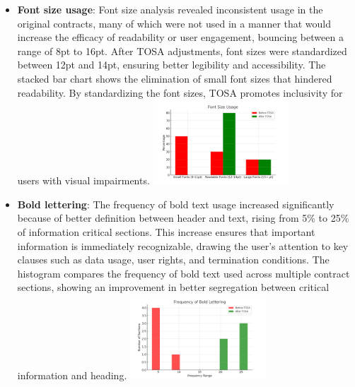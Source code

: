 \documentclass[sigconf, nonacm]{acmart}
\begin{document}
\begin{itemize}
\item \textbf{Font size usage}: Font size analysis revealed inconsistent usage in the original contracts, many of which were not used in a manner that would increase the efficacy of readability or user engagement, bouncing between a range of 8pt to 16pt. After TOSA adjustments, font sizes were standardized between 12pt and 14pt, ensuring better legibility and accessibility. The stacked bar chart shows the elimination of small font sizes that hindered readability. By standardizing the font sizes, TOSA promotes inclusivity for users with visual impairments.
{\center\includegraphics[width=0.4\textwidth]{./resources/font_size_usage_updated}}

\item \textbf{Bold lettering}: The frequency of bold text usage increased significantly because of better definition between header and text, rising from 5\% to 25\% of information critical sections. This increase ensures that important information is immediately recognizable, drawing the user's attention to key clauses such as data usage, user rights, and termination conditions. The histogram compares the frequency of bold text used across multiple contract sections, showing an improvement in better segregation between critical information and heading.
{\center\includegraphics[width=0.4\textwidth]{./resources/bold_lettering_usage_updated}}


\end{itemize}
\end{document}
